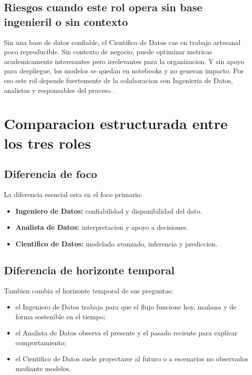 \documentclass[12pt]{article}
\begin{document}
\subsection{Riesgos cuando este rol opera sin base ingenieril o sin contexto}
Sin una base de datos confiable, el Cientifico de Datos cae en trabajo artesanal poco reproducible. Sin contexto de negocio, puede optimizar metricas academicamente interesantes pero irrelevantes para la organizacion. Y sin apoyo para despliegue, los modelos se quedan en notebooks y no generan impacto. Por eso este rol depende fuertemente de la colaboracion con Ingenieria de Datos, analistas y responsables del proceso \cite{ibm_modern_team,provost_fawcett,crispdm}.

\section{Comparacion estructurada entre los tres roles}
\subsection{Diferencia de foco}
La diferencia esencial esta en el foco primario:
\begin{itemize}[leftmargin=*]
\item \textbf{Ingeniero de Datos:} confiabilidad y disponibilidad del dato.
\item \textbf{Analista de Datos:} interpretacion y apoyo a decisiones.
\item \textbf{Cientifico de Datos:} modelado avanzado, inferencia y prediccion.
\end{itemize}

\subsection{Diferencia de horizonte temporal}
Tambien cambia el horizonte temporal de sus preguntas:
\begin{itemize}[leftmargin=*]
\item el Ingeniero de Datos trabaja para que el flujo funcione hoy, mañana y de forma sostenible en el tiempo;
\item el Analista de Datos observa el presente y el pasado reciente para explicar comportamiento;
\item el Cientifico de Datos suele proyectarse al futuro o a escenarios no observados mediante modelos.
\end{itemize}
\end{document}
